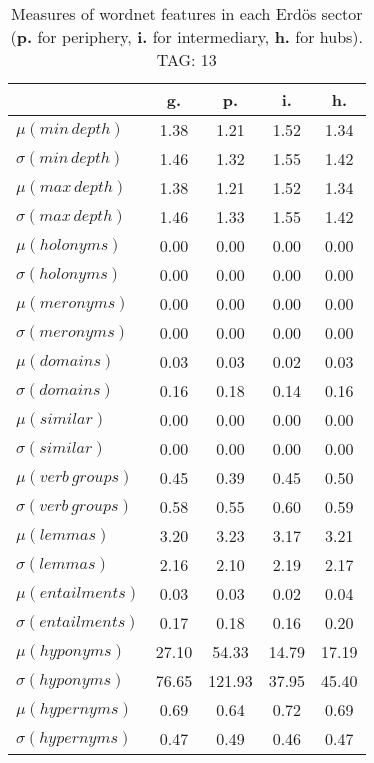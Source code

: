 \begin{table}[h!]
\begin{center}
\begin{tabular}{| l || c | c | c | c |}\hline
 & {\bf g.} & {\bf p.} & {\bf i.} & {\bf h.} \\\hline\hline
$\mu(min\,depth)$ & 1.38  & 1.21  & 1.52  & 1.34 \\
$\sigma(min\,depth)$ & 1.46  & 1.32  & 1.55  & 1.42 \\\hline
$\mu(max\,depth)$ & 1.38  & 1.21  & 1.52  & 1.34 \\
$\sigma(max\,depth)$ & 1.46  & 1.33  & 1.55  & 1.42 \\\hline
$\mu(holonyms)$ & 0.00  & 0.00  & 0.00  & 0.00 \\
$\sigma(holonyms)$ & 0.00  & 0.00  & 0.00  & 0.00 \\\hline
$\mu(meronyms)$ & 0.00  & 0.00  & 0.00  & 0.00 \\
$\sigma(meronyms)$ & 0.00  & 0.00  & 0.00  & 0.00 \\\hline
$\mu(domains)$ & 0.03  & 0.03  & 0.02  & 0.03 \\
$\sigma(domains)$ & 0.16  & 0.18  & 0.14  & 0.16 \\\hline
$\mu(similar)$ & 0.00  & 0.00  & 0.00  & 0.00 \\
$\sigma(similar)$ & 0.00  & 0.00  & 0.00  & 0.00 \\\hline
$\mu(verb\,groups)$ & 0.45  & 0.39  & 0.45  & 0.50 \\
$\sigma(verb\,groups)$ & 0.58  & 0.55  & 0.60  & 0.59 \\\hline
$\mu(lemmas)$ & 3.20  & 3.23  & 3.17  & 3.21 \\
$\sigma(lemmas)$ & 2.16  & 2.10  & 2.19  & 2.17 \\\hline
$\mu(entailments)$ & 0.03  & 0.03  & 0.02  & 0.04 \\
$\sigma(entailments)$ & 0.17  & 0.18  & 0.16  & 0.20 \\\hline
$\mu(hyponyms)$ & 27.10  & 54.33  & 14.79  & 17.19 \\
$\sigma(hyponyms)$ & 76.65  & 121.93  & 37.95  & 45.40 \\\hline
$\mu(hypernyms)$ & 0.69  & 0.64  & 0.72  & 0.69 \\
$\sigma(hypernyms)$ & 0.47  & 0.49  & 0.46  & 0.47 \\\hline
\end{tabular}
\caption{Measures of wordnet features in each Erd\"os sector ({{\bf p.}} for periphery, {{\bf i.}} for intermediary, {{\bf h.}} for hubs). TAG: 13}
\end{center}
\end{table}